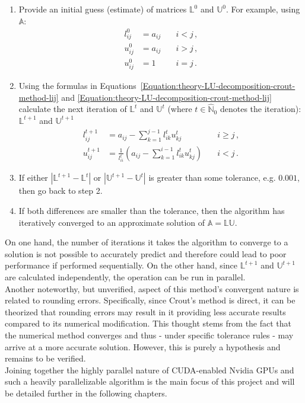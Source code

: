 \begin{enumerate}
	\item Provide an initial guess (estimate) of matrices $ \mathbb{L}^0 $ and $ \mathbb{U}^0 $. For example, using $ \mathbb{A} $:
		\begin{align}
			l_{ij}^{0} &= a_{ij} \quad &i < j \nonumber\,, \\
			u_{ij}^{0} &= a_{ij} \quad &i > j \nonumber\,, \\
			u_{ij}^{0} &= 1 \quad      &i = j \nonumber\,.
		\end{align}
	\item Using the formulas in Equations~\ref{Equation:theory-LU-decomposition-crout-method-lij} and \ref{Equation:theory-LU-decomposition-crout-method-lij} calculate the next iteration of $ \mathbb{L}^{t} $ and $ \mathbb{U}^{t} $ (where $ t \in \widehat{\mathbb{N}}_0 $ denotes the iteration): $ \mathbb{L}^{t+1} $ and $ \mathbb{U}^{t+1} $
		\begin{align}
			l_{ij}^{t+1} &= a_{ij} - \sum_{k=1}^{j-1}l_{ik}^{t}u_{kj}^{t} 								   		&\quad i \geq j \nonumber\,, \\
			u_{ij}^{t+1} &= \frac{1}{l_{ii}^{t}} \left ( a_{ij} - \sum_{k=1}^{i-1}l_{ik}^{t}u_{kj}^{t} \right ) &\quad i < j    \nonumber\,. 
		\end{align}
	\item If either $ \left | \mathbb{L}^{t+1} - \mathbb{L}^{t} \right | $ or $ \left | \mathbb{U}^{t+1} - \mathbb{U}^{t} \right | $ is greater than some tolerance, e.g. $ 0.001 $, then go back to step 2.
	\item If both differences are smaller than the tolerance, then the algorithm has iteratively converged to an approximate solution of $ \mathbb{A} = \mathbb{LU} $.
\end{enumerate}

On one hand, the number of iterations it takes the algorithm to converge to a solution is not possible to accurately predict and therefore could lead to poor performance if performed sequentially. On the other hand, since $ \mathbb{L}^{t+1} $ and $ \mathbb{U}^{t+1} $ are calculated independently, the operation can be run in parallel. \\
Another noteworthy, but unverified, aspect of this method's convergent nature is related to rounding errors. Specifically, since Crout's method is direct, it can be theorized that rounding errors may result in it providing less accurate results compared to its numerical modification. This thought stems from the fact that the numerical method converges and thus - under specific tolerance rules - may arrive at a more accurate solution. However, this is purely a hypothesis and remains to be verified. \\
Joining together the highly parallel nature of CUDA-enabled Nvidia GPUs and such a heavily parallelizable algorithm is the main focus of this project and will be detailed further in the following chapters.
